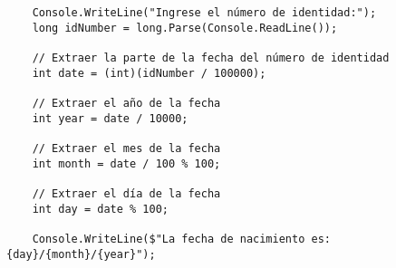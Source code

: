 \begin{lstlisting}
    Console.WriteLine("Ingrese el número de identidad:");
    long idNumber = long.Parse(Console.ReadLine());
    
    // Extraer la parte de la fecha del número de identidad
    int date = (int)(idNumber / 100000);
    
    // Extraer el año de la fecha
    int year = date / 10000;
    
    // Extraer el mes de la fecha
    int month = date / 100 % 100;
    
    // Extraer el día de la fecha
    int day = date % 100;
    
    Console.WriteLine($"La fecha de nacimiento es: {day}/{month}/{year}");
\end{lstlisting}